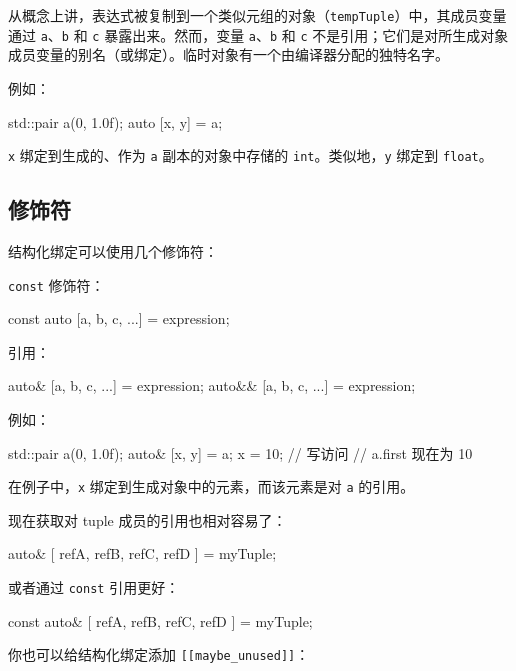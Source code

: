 从概念上讲，表达式被复制到一个类似元组的对象（\texttt{tempTuple}）中，其成员变量通过 \texttt{a}、\texttt{b} 和 \texttt{c} 暴露出来。然而，变量 \texttt{a}、\texttt{b} 和 \texttt{c} 不是引用；它们是对所生成对象成员变量的别名（或绑定）。临时对象有一个由编译器分配的独特名字。

例如：

\begin{codebox}[cpp]
std::pair a(0, 1.0f);
auto [x, y] = a;
\end{codebox}

\texttt{x} 绑定到生成的、作为 \texttt{a} 副本的对象中存储的 \texttt{int}。类似地，\texttt{y} 绑定到 \texttt{float}。

\subsection{修饰符}

结构化绑定可以使用几个修饰符：

\texttt{const} 修饰符：

\begin{codebox}[cpp]
const auto [a, b, c, ...] = expression;
\end{codebox}

引用：

\begin{codebox}[cpp]
auto& [a, b, c, ...] = expression;
auto&& [a, b, c, ...] = expression;
\end{codebox}

例如：

\begin{codebox}[cpp]
std::pair a(0, 1.0f);
auto& [x, y] = a;
x = 10;
// 写访问
// a.first 现在为 10
\end{codebox}

在例子中，\texttt{x} 绑定到生成对象中的元素，而该元素是对 \texttt{a} 的引用。

现在获取对 tuple 成员的引用也相对容易了：

\begin{codebox}[cpp]
auto& [ refA, refB, refC, refD ] = myTuple;
\end{codebox}

或者通过 \texttt{const} 引用更好：

\begin{codebox}[cpp]
const auto& [ refA, refB, refC, refD ] = myTuple;
\end{codebox}

你也可以给结构化绑定添加 \texttt{[[maybe\_unused]]}：

